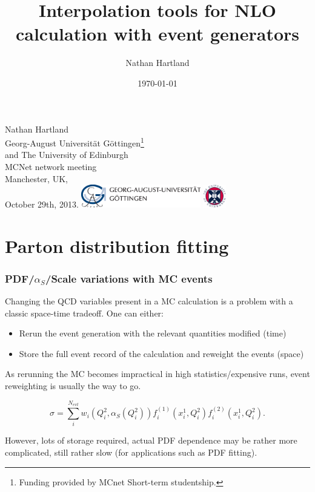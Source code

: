 \documentclass[10pt]{beamer}
\title[]{Interpolation tools for NLO calculation with event generators}
\author{Nathan Hartland}
\institute
{
Universit\"at G\"ottingen\\
\medskip
}
\date{\today}
\newcommand{\be}{\begin{equation*}}
\newcommand{\ee}{\end{equation*}}
\newcommand{\vso}{\vskip15pt}
\begin{document}
\renewcommand{\inserttotalframenumber}{13}


\begin{frame}
\begin{centering}
\vskip20pt
\vskip30pt
Nathan Hartland\\
\small{Georg-August Universit\"at G\"ottingen}\footnote{
Funding provided by MCnet Short-term studentship.}\\
\small{and The University of Edinburgh}\\
\vskip50pt
MCNet network meeting\\
Manchester, UK,\\
October 29th, 2013.
\vskip15pt
\includegraphics[height=1.0cm]{glogo.eps} \hfill
\includegraphics[height=1.0cm]{edinburghcrest.pdf}


\end{centering}

\end{frame}

\section{Parton distribution fitting}
\begin{frame}
\frametitle{PDF/$\alpha_S$/Scale variations with MC events}
Changing the QCD variables present in a MC calculation is a problem with a classic space-time tradeoff.
\vso
One can either: \vskip5pt
\begin{itemize}
		\item<1-> Rerun the event generation with the relevant quantities modified (time)
		\item<1-> Store the full event record of the calculation and reweight the events (space)
\end{itemize}
\vskip5pt
As rerunning the MC becomes impractical in high statistics/expensive runs, event reweighting is usually the way to go.
\vskip5pt

\be \sigma = \sum_i^{N_{evt}} w_i\left(Q^2_i,\alpha_S\left(  Q^2_i\right) \right)f^{(1)}_i\left(x^1_i, Q^2_i\right)f^{(2)}_i\left(x^1_i, Q^2_i\right) .  \ee
\vskip5pt

However, lots of storage required, actual PDF dependence may be rather more complicated, still rather slow (for applications such as PDF fitting).

\end{frame}
\end{document}
